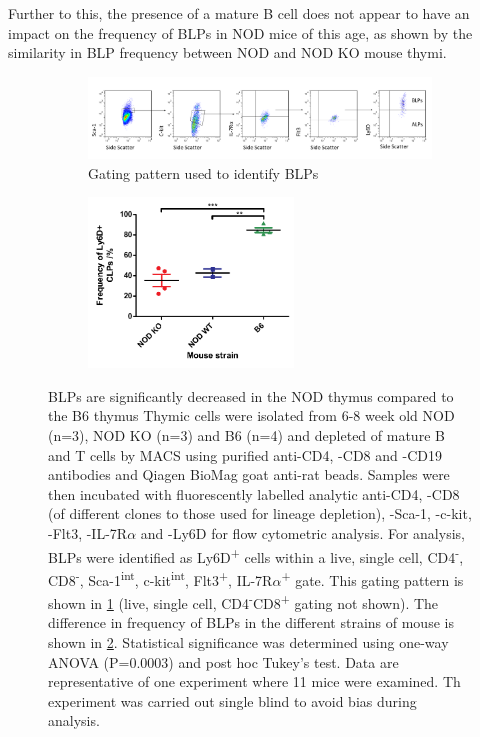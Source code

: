 Further to this, the presence of a mature B cell does not appear to have an impact on the frequency of BLPs in NOD mice of this age, as shown by the similarity in BLP frequency between NOD and NOD KO mouse thymi.


\begin{figure}
	\begin{subfigure}{\textwidth}
	\includegraphics[width=\textwidth]{Figures/BLPgating.png}
	\caption{Gating pattern used to identify BLPs}
	\label{subfig:BLPgating}
	\end{subfigure}
	\begin{subfigure}{\textwidth}
	\centering
	\includegraphics[width=0.6\textwidth]{Figures/Ly6D.pdf}
	\caption{}
	\label{subfig:BLPgraph}
	\end{subfigure}
\caption[BLPs are significantly decreased in the NOD thymus compared to the B6 thymus]{BLPs are significantly decreased in the NOD thymus compared to the B6 thymus
Thymic cells were isolated from 6-8 week old NOD (n=3), NOD KO (n=3) and B6 (n=4) and depleted of mature B and T cells by MACS using purified anti-CD4, -CD8 and -CD19 antibodies and Qiagen BioMag goat anti-rat beads.
Samples were then incubated with fluorescently labelled analytic anti-CD4, -CD8 (of different clones to those used for lineage depletion), -Sca-1, -c-kit, -Flt3, -IL-7R$\alpha$ and -Ly6D for flow cytometric analysis.
For analysis, BLPs were identified as Ly6D\textsuperscript{+} cells within a live, single cell, CD4\textsuperscript{-}, CD8\textsuperscript{-}, Sca-1\textsuperscript{int}, c-kit\textsuperscript{int}, Flt3\textsuperscript{+}, IL-7R$\alpha$\textsuperscript{+} gate.
This gating pattern is shown in \ref{subfig:BLPgating} (live, single cell, CD4\textsuperscript{-}CD8\textsuperscript{+} gating not shown).
The difference in frequency of BLPs in the different strains of mouse is shown in \ref{subfig:BLPgraph}. Statistical significance was determined using one-way ANOVA (P=0.0003) and post hoc Tukey's test.
Data are representative of one experiment where 11 mice were examined.
Th experiment was carried out single blind to avoid bias during analysis.}
\label{fig:BLPs}
\end{figure}

